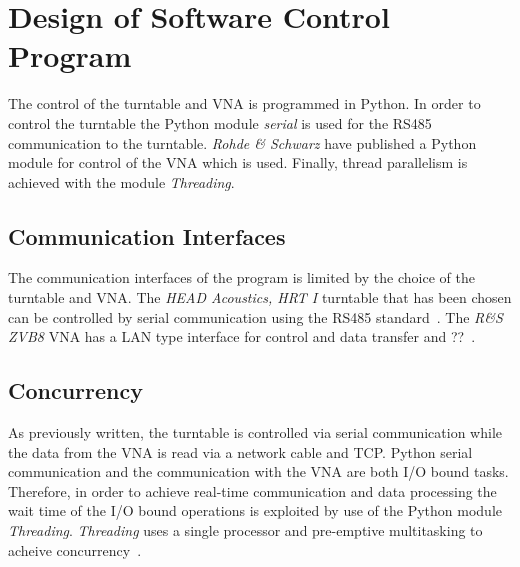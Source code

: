 \section{Design of Software Control Program}
The control of the turntable and VNA is programmed in Python. In order to control the turntable the Python module \textit{serial} is used for the RS485 communication to the turntable. \textit{Rohde \& Schwarz} have published a Python module for control of the VNA which is used. Finally, thread parallelism is achieved with the module \textit{Threading}.

\subsection{Communication Interfaces}
The communication interfaces of the program is limited by the choice of the turntable and VNA. The \textit{HEAD Acoustics, HRT I} turntable that has been chosen can be controlled by serial communication using the RS485 standard~\cite{hrt_i_data_sheet}. The \textit{R\&S ZVB8} VNA has a LAN type interface for control and data transfer and ??~\cite{vna_data_sheet_descrip}.


\subsection{Concurrency}
As previously written, the turntable is controlled via serial communication while the data from the VNA is read via a network cable and TCP. Python serial communication and the communication with the VNA are both I/O bound tasks. Therefore, in order to achieve real-time communication and data processing the wait time of the I/O bound operations is exploited by use of the Python module \textit{Threading}. \textit{Threading} uses a single processor and pre-emptive multitasking to acheive concurrency~\cite{concurrency}. 

